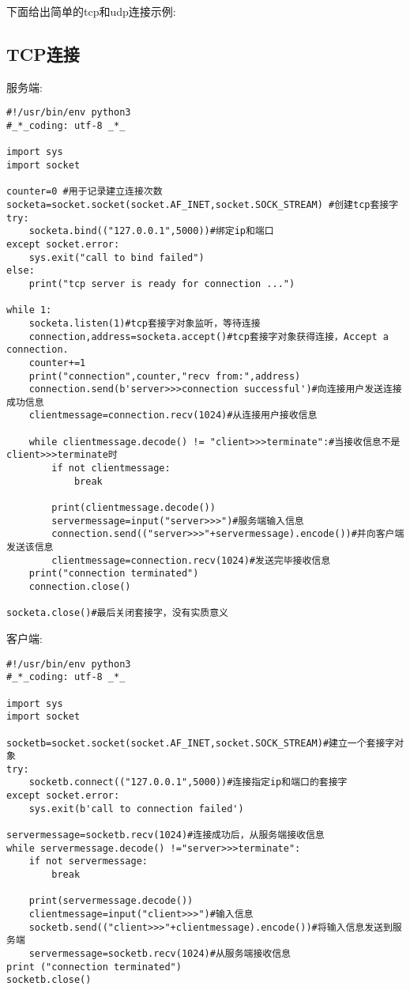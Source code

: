 \documentclass[twoside,11pt]{book}
\begin{document}
下面给出简单的tcp和udp连接示例:

\subsection{TCP连接}

服务端:

\begin{lstlisting}
#!/usr/bin/env python3
#_*_coding: utf-8 _*_

import sys
import socket

counter=0 #用于记录建立连接次数
socketa=socket.socket(socket.AF_INET,socket.SOCK_STREAM) #创建tcp套接字
try:
    socketa.bind(("127.0.0.1",5000))#绑定ip和端口
except socket.error:
    sys.exit("call to bind failed")
else:
    print("tcp server is ready for connection ...")

while 1:
    socketa.listen(1)#tcp套接字对象监听，等待连接
    connection,address=socketa.accept()#tcp套接字对象获得连接，Accept a connection.
    counter+=1
    print("connection",counter,"recv from:",address)
    connection.send(b'server>>>connection successful')#向连接用户发送连接成功信息
    clientmessage=connection.recv(1024)#从连接用户接收信息

    while clientmessage.decode() != "client>>>terminate":#当接收信息不是client>>>terminate时
        if not clientmessage:
            break

        print(clientmessage.decode())
        servermessage=input("server>>>")#服务端输入信息
        connection.send(("server>>>"+servermessage).encode())#并向客户端发送该信息
        clientmessage=connection.recv(1024)#发送完毕接收信息
    print("connection terminated")
    connection.close()

socketa.close()#最后关闭套接字，没有实质意义
\end{lstlisting}

客户端:
\begin{lstlisting}
#!/usr/bin/env python3
#_*_coding: utf-8 _*_

import sys
import socket

socketb=socket.socket(socket.AF_INET,socket.SOCK_STREAM)#建立一个套接字对象
try:
    socketb.connect(("127.0.0.1",5000))#连接指定ip和端口的套接字
except socket.error:
    sys.exit(b'call to connection failed')

servermessage=socketb.recv(1024)#连接成功后，从服务端接收信息
while servermessage.decode() !="server>>>terminate":
    if not servermessage:
        break

    print(servermessage.decode())
    clientmessage=input("client>>>")#输入信息
    socketb.send(("client>>>"+clientmessage).encode())#将输入信息发送到服务端
    servermessage=socketb.recv(1024)#从服务端接收信息
print ("connection terminated")
socketb.close()
\end{lstlisting}
\end{document}
